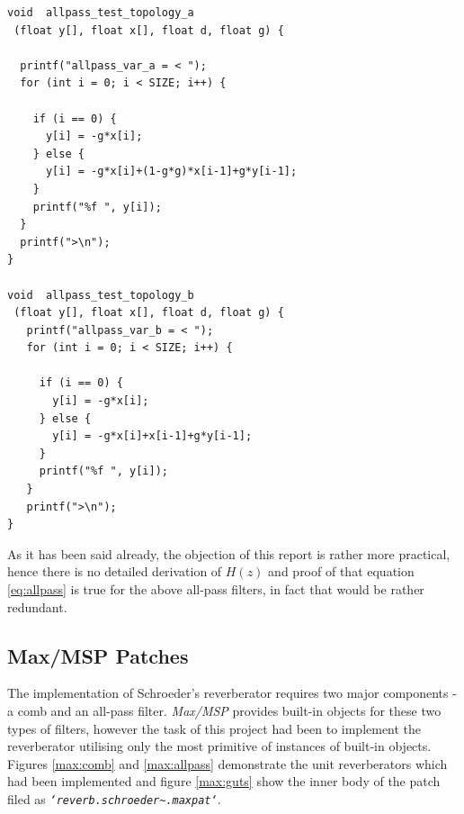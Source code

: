 \documentclass[12pt]{report}
\begin{document}
\begin{lstlisting}
void  allpass_test_topology_a
 (float y[], float x[], float d, float g) {

  printf("allpass_var_a = < ");
  for (int i = 0; i < SIZE; i++) {
  
    if (i == 0) { 
      y[i] = -g*x[i];
    } else {
      y[i] = -g*x[i]+(1-g*g)*x[i-1]+g*y[i-1];
    }
    printf("%f ", y[i]);
  }
  printf(">\n");
}

void  allpass_test_topology_b
 (float y[], float x[], float d, float g) {
   printf("allpass_var_b = < ");
   for (int i = 0; i < SIZE; i++) {

     if (i == 0) { 
       y[i] = -g*x[i];
     } else {
       y[i] = -g*x[i]+x[i-1]+g*y[i-1];
     }
     printf("%f ", y[i]);
   }
   printf(">\n");
}
\end{lstlisting}
\vspace{2em}
As it has been said already, the objection of this report is rather more
practical, hence there is no detailed derivation of $H(z)$ and proof of
that equation \ref{eq:allpass} is true for the above all-pass filters,
in fact that would be rather redundant.

\subsection{Max/MSP Patches}

The implementation of Schroeder's reverberator requires two major components -
a comb and an all-pass filter. \emph{Max/MSP} provides built-in objects for
these two types of filters, however the task of this project had been to
implement the reverberator utilising only the most primitive of instances of
built-in objects. Figures \ref{max:comb} and \ref{max:allpass} demonstrate
the unit reverberators which had been implemented and figure \ref{max:guts}
show the inner body of the patch filed as
\emph{\texttt{`reverb.schroeder\~{}.maxpat`}}.
\end{document}
